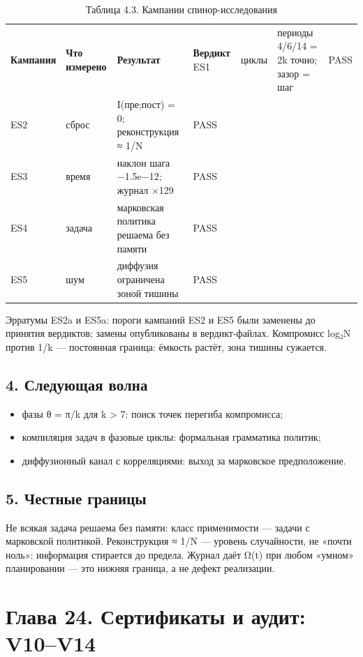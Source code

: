 \documentclass[11pt,a4paper]{article}
\begin{document}
\begin{table}[htbp]\centering\small
\caption{Таблица 4.3. Кампании спинор-исследования}
\begin{tabular}{p{} p{} p{} p{}}
\toprule
\textbf{Кампания} & \textbf{Что измерено} & \textbf{Результат} & \textbf{Вердикт}
\midrule
ES1 & циклы & периоды 4/6/14 = 2k точно; зазор = шаг & PASS \\
ES2 & сброс & I(пре;пост) = 0; реконструкция ≈ 1/N & PASS \\
ES3 & время & наклон шага −1.5e−12; журнал ×129 & PASS \\
ES4 & задача & марковская политика решаема без памяти & PASS \\
ES5 & шум & диффузия ограничена зоной тишины & PASS \\
\bottomrule
\end{tabular}
\end{table}

Эрратумы ES2a и ES5a: пороги кампаний ES2 и ES5 были заменены до принятия вердиктов; замены опубликованы в вердикт-файлах. Компромисс log₂N против 1/k — постоянная граница: ёмкость растёт, зона тишины сужается.

\subsection{4. Следующая волна}

\begin{itemize}
  \item фазы θ = π/k для k > 7: поиск точек перегиба компромисса;
  \item компиляция задач в фазовые циклы: формальная грамматика политик;
  \item диффузионный канал с корреляциями: выход за марковское предположение.
\end{itemize}

\subsection{5. Честные границы}

Не всякая задача решаема без памяти: класс применимости — задачи с марковской политикой. Реконструкция ≈ 1/N — уровень случайности, не «почти ноль»: информация стирается до предела. Журнал даёт Ω(t) при любом «умном» планировании — это нижняя граница, а не дефект реализации.

\section{Глава 24. Сертификаты и аудит: V10–V14}
\end{document}
